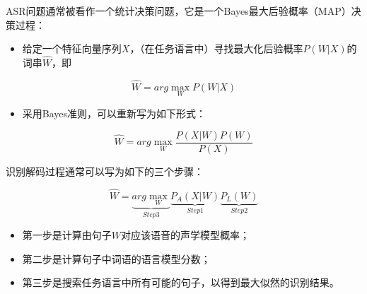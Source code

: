 \documentclass[]{article}
\begin{document}
ASR问题通常被看作一个统计决策问题，它是一个Bayes最大后验概率（MAP）决策过程：

\begin{itemize}
\item
  给定一个特征向量序列$X$，（在任务语言中）寻找最大化后验概率$P(W|X)$的词串$\hat{W}$，即
\end{itemize}

$$\hat{W}=arg\max_WP(W|X)$$

\begin{itemize}
\item
  采用Bayes准则，可以重新写为如下形式：
\end{itemize}

$$\hat{W}=arg\max_W\frac{P(X|W)P(W)}{P(X)}$$

识别解码过程通常可以写为如下的三个步骤：

$$\hat{W}=\underbrace{arg\max_W}_{Step3}\underbrace{P_A(X|W)}_{Step1}\underbrace{P_L(W)}_{Step2}$$

\begin{itemize}
\item
  第一步是计算由句子$W$对应该语音的声学模型概率；
\item
  第二步是计算句子中词语的语言模型分数；
\item
  第三步是搜索任务语言中所有可能的句子，以得到最大似然的识别结果。
\end{itemize}
\end{document}
